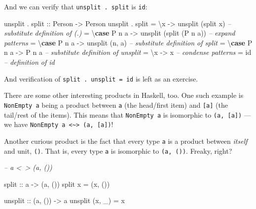 \documentclass[]{article}
\newenvironment{Shaded}{}{}
\newcommand{\CommentTok}[1]{\textcolor[rgb]{0.38,0.63,0.69}{\textit{#1}}}
\newcommand{\DataTypeTok}[1]{\textcolor[rgb]{0.56,0.13,0.00}{#1}}
\newcommand{\FunctionTok}[1]{\textcolor[rgb]{0.02,0.16,0.49}{#1}}
\newcommand{\KeywordTok}[1]{\textcolor[rgb]{0.00,0.44,0.13}{\textbf{#1}}}
\newcommand{\NormalTok}[1]{#1}
\newcommand{\OtherTok}[1]{\textcolor[rgb]{0.00,0.44,0.13}{#1}}
\begin{document}
And we can verify that \texttt{unsplit\ .\ split} is \texttt{id}:

\begin{Shaded}
\begin{Highlighting}[]
\NormalTok{unsplit }\FunctionTok{.}\OtherTok{ split ::} \DataTypeTok{Person} \OtherTok{->} \DataTypeTok{Person}
\NormalTok{unsplit }\FunctionTok{.}\NormalTok{ split}
    \FunctionTok{=}\NormalTok{ \textbackslash{}x          }\OtherTok{->}\NormalTok{ unsplit (split x)        }\CommentTok{-- substitute definition of (.)}
    \FunctionTok{=}\NormalTok{ \textbackslash{}}\KeywordTok{case} \DataTypeTok{P}\NormalTok{ n a }\OtherTok{->}\NormalTok{ unsplit (split (}\DataTypeTok{P}\NormalTok{ n a))  }\CommentTok{-- expand patterns}
    \FunctionTok{=}\NormalTok{ \textbackslash{}}\KeywordTok{case} \DataTypeTok{P}\NormalTok{ n a }\OtherTok{->}\NormalTok{ unsplit (n, a)           }\CommentTok{-- substitute definition of split}
    \FunctionTok{=}\NormalTok{ \textbackslash{}}\KeywordTok{case} \DataTypeTok{P}\NormalTok{ n a }\OtherTok{->} \DataTypeTok{P}\NormalTok{ n a                    }\CommentTok{-- substitute definition of unsplit}
    \FunctionTok{=}\NormalTok{ \textbackslash{}x      }\OtherTok{->}\NormalTok{ x                            }\CommentTok{-- condense patterns}
    \FunctionTok{=}\NormalTok{ id                                      }\CommentTok{-- definition of id}
\end{Highlighting}
\end{Shaded}

And verification of \texttt{split\ .\ unsplit\ =\ id} is left as an exercise.

There are some other interesting products in Haskell, too. One such example is
\texttt{NonEmpty\ a} being a product between \texttt{a} (the head/first item)
and \texttt{{[}a{]}} (the tail/rest of the items). This means that
\texttt{NonEmpty\ a} is isomorphic to \texttt{(a,\ {[}a{]})} --- we have
\texttt{NonEmpty\ a\ \textless{}\textasciitilde{}\textgreater{}\ (a,\ {[}a{]})}!

Another curious product is the fact that every type \texttt{a} is a product
between \emph{itself} and unit, \texttt{()}. That is, every type \texttt{a} is
isomorphic to \texttt{(a,\ ())}. Freaky, right?

\begin{Shaded}
\begin{Highlighting}[]
\CommentTok{-- a <~> (a, ())}

\OtherTok{split ::}\NormalTok{ a }\OtherTok{->}\NormalTok{ (a, ())}
\NormalTok{split x }\FunctionTok{=}\NormalTok{ (x, ())}

\OtherTok{unsplit ::}\NormalTok{ (a, ()) }\OtherTok{->}\NormalTok{ a}
\NormalTok{unsplit (x, _) }\FunctionTok{=}\NormalTok{ x}
\end{Highlighting}
\end{Shaded}
\end{document}
